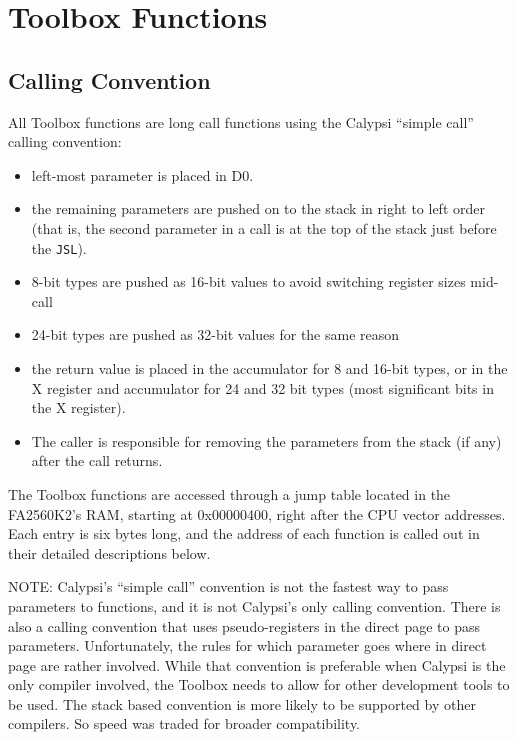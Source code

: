 \chapter{Toolbox Functions}

\section{Calling Convention}

All Toolbox functions are long call functions using the Calypsi ``simple call'' calling convention:
\begin{itemize}
	\item left-most parameter is placed in D0.
	\item the remaining parameters are pushed on to the stack in right to left order (that is, the second parameter in a call is at the top of the stack just before the \verb+JSL+).
	\item 8-bit types are pushed as 16-bit values to avoid switching register sizes mid-call
	\item 24-bit types are pushed as 32-bit values for the same reason
	\item the return value is placed in the accumulator for 8 and 16-bit types, or in the X register and accumulator for 24 and 32 bit types (most significant bits in the X register).
	\item The caller is responsible for removing the parameters from the stack (if any) after the call returns.
\end{itemize}

The Toolbox functions are accessed through a jump table located in the FA2560K2's RAM, starting at 0x00000400, right after the CPU vector addresses. Each entry is six bytes long, and the address of each function is called out in their detailed descriptions below.

NOTE: Calypsi's ``simple call'' convention is not the fastest way to pass parameters to functions, and it is not Calypsi's only calling convention.
There is also a calling convention that uses pseudo-registers in the direct page to pass parameters.
Unfortunately, the rules for which parameter goes where in direct page are rather involved.
While that convention is preferable when Calypsi is the only compiler involved, the Toolbox needs to allow for other development tools to be used.
The stack based convention is more likely to be supported by other compilers. So speed was traded for broader compatibility.

